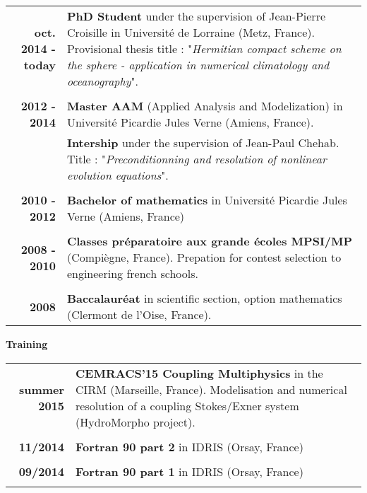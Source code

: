 \documentclass[10pt,a4paper]{report}
\begin{document}
\begin{center}
\begin{tabular}{r p{12cm}}
\textbf{oct. 2014 - today} & \textbf{PhD Student} under the supervision of Jean-Pierre Croisille in Université de Lorraine (Metz, France). Provisional thesis title : "\textit{Hermitian compact scheme on the sphere - application in numerical climatology and oceanography}".\\

& \\

\textbf{2012 - 2014} & \textbf{Master AAM} (Applied Analysis and Modelization) in Université Picardie Jules Verne (Amiens, France). \\

& \textbf{Intership} under the supervision of Jean-Paul Chehab. Title : "\textit{Preconditionning and resolution of nonlinear evolution equations}". \\

& \\

\textbf{2010 - 2012} & \textbf{Bachelor of mathematics} in Université Picardie Jules Verne (Amiens, France) \\

& \\

\textbf{2008 - 2010} & \textbf{Classes préparatoire aux grande écoles MPSI/MP} (Compiègne, France). Prepation for contest selection to engineering french schools. \\

& \\

\textbf{2008} & \textbf{Baccalauréat} in scientific section, option mathematics (Clermont de l'Oise, France).\\
\end{tabular}
\end{center}

\vspace{0.4cm}
\noindent
{\selectfont
\textbf{Training}
}

\begin{center}
\begin{tabular}{r p{12cm}}
\textbf{summer 2015} & \textbf{CEMRACS'15 Coupling Multiphysics} in the CIRM (Marseille, France). Modelisation and numerical resolution of a coupling Stokes/Exner system (HydroMorpho project).\\

& \\

\textbf{11/2014} & \textbf{Fortran 90 part 2} in IDRIS (Orsay, France)\\

& \\

\textbf{09/2014} & \textbf{Fortran 90 part 1} in IDRIS (Orsay, France)\\

& \\

\end{tabular}
\end{center}
\end{document}
